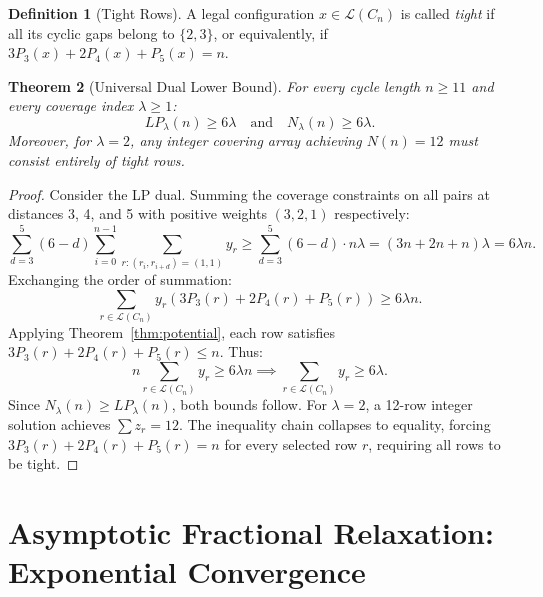 \documentclass[11pt,a4paper]{article}
\newtheorem{theorem}{Theorem}[section]
\theoremstyle{definition}
\newtheorem{definition}[theorem]{Definition}
\theoremstyle{remark}
\begin{document}
\begin{definition}[Tight Rows]
A legal configuration $x \in \mathcal{L}(C_n)$ is called \emph{tight} if all its cyclic gaps belong to $\{2, 3\}$, or equivalently, if $3P_3(x) + 2P_4(x) + P_5(x) = n$.
\end{definition}

\begin{theorem}[Universal Dual Lower Bound]
\label{thm:universal_lower_bound}
For every cycle length $n \ge 11$ and every coverage index $\lambda \ge 1$:
\begin{equation}
    LP_\lambda(n) \ge 6\lambda \quad \text{and} \quad N_\lambda(n) \ge 6\lambda.
\end{equation}
Moreover, for $\lambda = 2$, any integer covering array achieving $N(n) = 12$ must consist entirely of tight rows.
\end{theorem}

\begin{proof}
Consider the LP dual. Summing the coverage constraints on all pairs at distances 3, 4, and 5 with positive weights $(3, 2, 1)$ respectively:
\begin{equation}
    \sum_{d=3}^5 (6 - d) \sum_{i=0}^{n-1} \sum_{r: (r_i, r_{i+d})=(1, 1)} y_r \ge \sum_{d=3}^5 (6 - d) \cdot n \lambda = (3n + 2n + n)\lambda = 6\lambda n.
\end{equation}
Exchanging the order of summation:
\begin{equation}
    \sum_{r \in \mathcal{L}(C_n)} y_r \left( 3P_3(r) + 2P_4(r) + P_5(r) \right) \ge 6\lambda n.
\end{equation}
Applying Theorem~\ref{thm:potential}, each row satisfies $3P_3(r) + 2P_4(r) + P_5(r) \le n$. Thus:
\begin{equation}
    n \sum_{r \in \mathcal{L}(C_n)} y_r \ge 6\lambda n \implies \sum_{r \in \mathcal{L}(C_n)} y_r \ge 6\lambda.
\end{equation}
Since $N_\lambda(n) \ge LP_\lambda(n)$, both bounds follow. For $\lambda = 2$, a 12-row integer solution achieves $\sum z_r = 12$. The inequality chain collapses to equality, forcing $3P_3(r) + 2P_4(r) + P_5(r) = n$ for every selected row $r$, requiring all rows to be tight.
\end{proof}

\section{Asymptotic Fractional Relaxation: Exponential Convergence}
\label{sec:fractional_limit}
\end{document}
